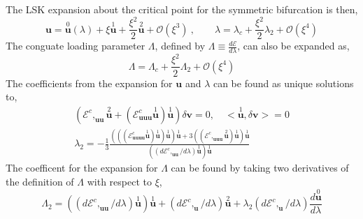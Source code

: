 \documentclass[11pt]{report}
\begin{document}
\begin{appendices}
  The LSK expansion about the critical point for the symmetric bifurcation is then,
  \begin{equation}
  	\mathbf{u} = \overset{0}{\mathbf{u}}(\lambda) + \xi \overset{1}{\mathbf{u}} + \frac{\xi^2}{2} \overset{2}{\mathbf{u}} + \mathcal{O}(\xi^3) \:, \qquad \lambda = \lambda_c + \frac{\xi^2}{2} \lambda_2 + \mathcal{O}(\xi^4)
  \end{equation}
The conguate loading parameter $\Lambda$, defined by $\Lambda \equiv \frac{d \mathcal{E}}{d \lambda}$, can also be expanded as,
\begin{equation}
	\Lambda = \Lambda_c + \frac{\xi^2}{2} \Lambda_2 + \mathcal{O}(\xi^4)
\end{equation}
The coefficients from the expansion for $\mathbf{u}$ and $\lambda$ can be found as unique solutions to,
\begin{align}
(\mathcal{E}^c,_{\mathbf{u} \mathbf{u}} \overset{2}{\mathbf{u}} + (\mathcal{E}^c_{\mathbf{u} \mathbf{u} \mathbf{u}} \overset{1}{\mathbf{u}}) \overset{1}{\mathbf{u}} ) \delta \mathbf{v} = 0, \quad <\overset{1}{\mathbf{u}}, \delta\mathbf{v}> = 0   \label{eq:u2_eq}\\
\lambda_2 = -\frac{1}{3} \frac{(((\mathcal{E}^c_{\mathbf{u} \mathbf{u} \mathbf{u} \mathbf{u}} \overset{1}{\mathbf{u}}) \overset{1}{\mathbf{u}}) \overset{1}{\mathbf{u}}) \overset{1}{\mathbf{u}} 
		+ 3 ((\mathcal{E}^c,_{\mathbf{u} \mathbf{u} \mathbf{u}}\overset{2}{\mathbf{u}})\overset{1}{\mathbf{u}})\overset{1}{\mathbf{u}}}{((d\mathcal{E}^c,_{\mathbf{u} \mathbf{u}}/d\lambda)\overset{1}{\mathbf{u}})\overset{1}{\mathbf{u}}}
\end{align}
The coefficent for the expansion for $\Lambda$ can be found by taking two derivatives of the definition of $\Lambda$ with respect to $\xi$,
\begin{equation}
	\Lambda_2 =  ((d\mathcal{E}^c,_{\mathbf{u} \mathbf{u}}/d\lambda)\overset{1}{\mathbf{u}})\overset{1}{\mathbf{u}} + (d\mathcal{E}^c,_{\mathbf{u}}/d\lambda) \overset{2}{\mathbf{u}} + \lambda_2(d\mathcal{E}^c,_{\mathbf{u}}/d\lambda) \frac{d \overset{0}{\mathbf{u}}}{d \lambda}
\end{equation}


\end{appendices}
\end{document}
